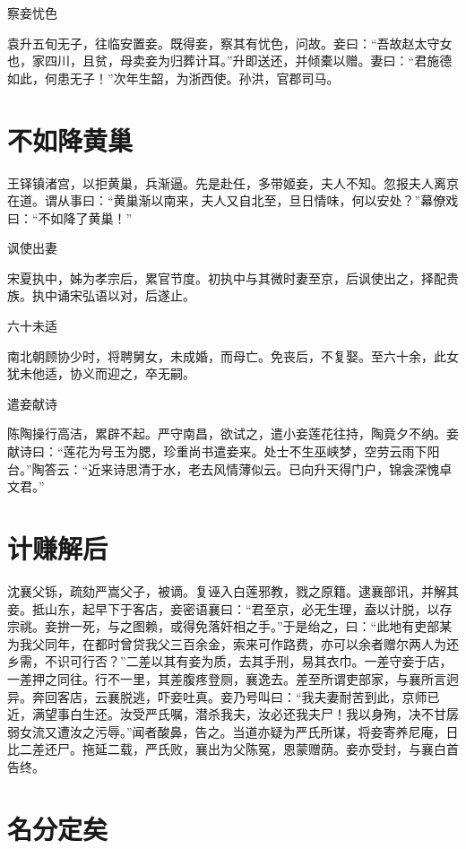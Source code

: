 \documentclass[a4paper,12pt,UTF8,twoside]{ctexbook}
\begin{document}
    察妾忧色
    
    袁升五旬无子，往临安置妾。既得妾，察其有忧色，问故。妾曰：“吾故赵太守女也，家四川，且贫，母卖妾为归葬计耳。”升即送还，并倾橐以赠。妻曰：“君施德如此，何患无子！”次年生韶，为浙西使。孙洪，官郡司马。
    
    \section{不如降黄巢}
    
    王铎镇渚宫，以拒黄巢，兵渐逼。先是赴任，多带姬妾，夫人不知。忽报夫人离京在道。谓从事曰：“黄巢渐以南来，夫人又自北至，旦日情味，何以安处？”幕僚戏曰：“不如降了黄巢！”
    
    讽使出妻
    
    宋夏执中，姊为孝宗后，累官节度。初执中与其微时妻至京，后讽使出之，择配贵族。执中诵宋弘语以对，后遂止。
    
    六十未适
    
    南北朝顾协少时，将聘舅女，未成婚，而母亡。免丧后，不复娶。至六十余，此女犹未他适，协义而迎之，卒无嗣。
    
    遣妾献诗
    
    陈陶操行高洁，累辟不起。严守南昌，欲试之，遣小妾莲花往持，陶竟夕不纳。妾献诗曰：“莲花为号玉为腮，珍重尚书遣妾来。处士不生巫峡梦，空劳云雨下阳台。”陶答云：“近来诗思清于水，老去风情薄似云。已向升天得门户，锦衾深愧卓文君。”
    
    \section{计赚解后}
    
    沈襄父铄，疏劾严嵩父子，被谪。复诬入白莲邪教，戮之原籍。逮襄部讯，并解其妾。抵山东，起早下于客店，妾密语襄曰：“君至京，必无生理，盍以计脱，以存宗祧。妾拚一死，与之图赖，或得免落奸相之手。”于是绐之，曰：“此地有吏部某为我父同年，在都时曾贷我父三百余金，索来可作路费，亦可以余者赠尔两人为还乡需，不识可行否？”二差以其有妾为质，去其手刑，易其衣巾。一差守妾于店，一差押之同往。行不一里，其差腹疼登厕，襄逸去。差至所谓吏部家，与襄所言迥异。奔回客店，云襄脱逃，吓妾吐真。妾乃号叫曰：“我夫妻耐苦到此，京师已近，满望事白生还。汝受严氏嘱，潜杀我夫，汝必还我夫尸！我以身殉，决不甘孱弱女流又遭汝之污辱。”闻者酸鼻，告之。当道亦疑为严氏所谋，将妾寄养尼庵，日比二差还尸。拖延二载，严氏败，襄出为父陈冤，恩蒙赠荫。妾亦受封，与襄白首告终。
    
    \section{名分定矣}
    
\end{document}
